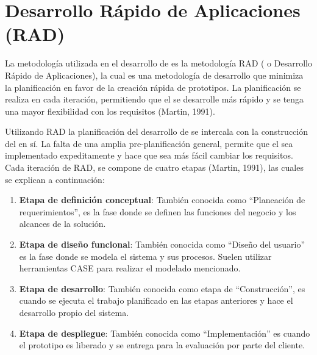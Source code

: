 \section{Desarrollo Rápido de Aplicaciones (RAD)}
La metodología utilizada en el desarrollo de  es la metodología RAD ( o Desarrollo Rápido de Aplicaciones), la cual es una metodología de desarrollo que minimiza la planificación en favor de la creación rápida de prototipos. La planificación se realiza en cada iteración, permitiendo que el  se desarrolle más rápido y se tenga una mayor flexibilidad con los requisitos (Martin, 1991).

Utilizando RAD la planificación del desarrollo de  se intercala con la construcción del  en sí. La falta de una amplia pre-planificación general, permite que el  sea implementado expeditamente y hace que sea más fácil cambiar los requisitos. Cada iteración de RAD, se compone de cuatro etapas (Martin, 1991), las cuales se explican a continuación: 

\begin{enumerate}
	\item \textbf{Etapa de definición conceptual}: También conocida como “Planeación de requerimientos”, es la fase donde se definen las funciones del negocio y los alcances de la solución.
	\item \textbf{Etapa de diseño funcional}: También conocida como “Diseño del usuario” es la fase donde se modela el sistema y sus procesos. Suelen utilizar herramientas CASE para realizar el modelado mencionado.
	\item \textbf{Etapa de desarrollo}: También conocida como etapa de “Construcción”, es cuando se ejecuta el trabajo planificado en las etapas anteriores y hace el desarrollo propio del sistema.
	\item \textbf{Etapa de despliegue}: También conocida como “Implementación” es cuando el prototipo es liberado y se entrega para la evaluación por parte del cliente. 
\end{enumerate}